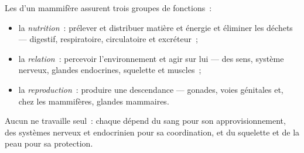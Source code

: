 \begin{proposition}\label{prop:b1:mammal-organization:functions}
Les  d'un mammifère assurent trois groupes de fonctions~:
\begin{itemize}
  \item la \emph{nutrition}~: prélever et
        distribuer matière et énergie et éliminer les déchets ---
         digestif, respiratoire, circulatoire et excréteur~;
  \item la \emph{relation}~: percevoir
        l'environnement et agir sur lui ---  des sens, système
        nerveux, glandes endocrines, squelette et muscles~;
  \item la \emph{reproduction}~:
        produire une descendance --- gonades, voies génitales et, chez
        les mammifères, glandes mammaires.
\end{itemize}
Aucun  ne travaille seul~: chaque  dépend du sang pour son
approvisionnement, des systèmes nerveux et endocrinien pour sa
coordination, et du squelette et de la peau pour sa protection.
\end{proposition}

